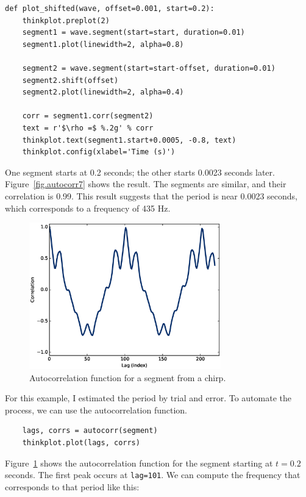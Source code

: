\documentclass[12pt]{book}
\begin{document}
\begin{verbatim}
def plot_shifted(wave, offset=0.001, start=0.2):
    thinkplot.preplot(2)
    segment1 = wave.segment(start=start, duration=0.01)
    segment1.plot(linewidth=2, alpha=0.8)

    segment2 = wave.segment(start=start-offset, duration=0.01)
    segment2.shift(offset)
    segment2.plot(linewidth=2, alpha=0.4)

    corr = segment1.corr(segment2)
    text = r'$\rho =$ %.2g' % corr
    thinkplot.text(segment1.start+0.0005, -0.8, text)
    thinkplot.config(xlabel='Time (s)')
\end{verbatim} 

One segment starts at 0.2 seconds; the other starts 0.0023 seconds
later.  Figure~\ref{fig.autocorr7} shows the result.  The segments
are similar, and their correlation is 0.99.  This result suggests
that the period is near 0.0023 seconds, which corresponds to a frequency
of 435 Hz.

\begin{figure}
\centerline{\includegraphics[height=2.5in]{figs/autocorr8.eps}}
\caption{Autocorrelation function for a segment from a chirp.}
\label{fig.autocorr8}
\end{figure}

For this example, I estimated the period by trial and error.  To automate
the process, we can use the autocorrelation function.

\begin{verbatim}
    lags, corrs = autocorr(segment)
    thinkplot.plot(lags, corrs)
\end{verbatim}

Figure~\ref{fig.autocorr8} shows the autocorrelation function for
the segment starting at $t=0.2$ seconds.  The first peak occurs at
{\tt lag=101}.  We can compute the frequency that corresponds
to that period like this:
\end{document}

